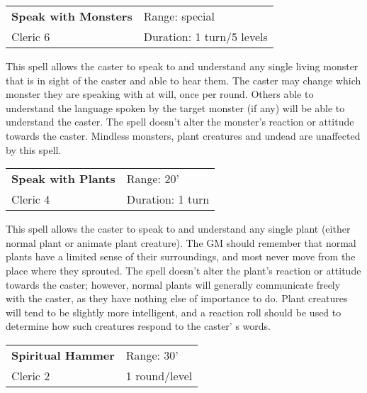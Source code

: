\documentclass[a4paper,twoside,openany,10pt]{book}
\begin{document}
\begin{multicols}{2}
\smallskip\begin{flushleft} 
	\begin{tabularx}{0.45\textwidth}{@{}m{3.5cm}m{5.5cm}@{}} 
		\textbf{Speak with Monsters} & Range: special\\
		Cleric 6 & Duration: 1 turn/5 levels\\
	\end{tabularx}\end{flushleft}

This spell allows the caster to speak to and understand any single living monster that is in sight of the caster and able to hear them. The caster may change which monster they are speaking with at will, once per round. Others able to understand the language spoken by the target monster (if any) will be able to understand the caster. The spell doesn't alter the monster's reaction or attitude towards the caster. Mindless monsters, plant creatures and undead are unaffected by this spell.


\smallskip\begin{flushleft} 
	\begin{tabularx}{0.45\textwidth}{@{}m{3.5cm}m{5.5cm}@{}} 
		\textbf{Speak with Plants} & Range: 20'\\
		Cleric 4 & Duration: 1 turn\\
	\end{tabularx}\end{flushleft}

This spell allows the caster to speak to and understand any single plant (either normal plant or animate plant creature). The GM should remember that normal plants have a limited sense of their surroundings, and most never move from the place where they sprouted. The spell doesn't alter the plant's reaction or attitude towards the caster; however, normal plants will generally communicate freely with the caster, as they have nothing else of importance to do. Plant creatures will tend to be slightly more intelligent, and a reaction roll should be used to determine how such creatures respond to the caster' s words.

\smallskip\begin{flushleft} 
	\begin{tabularx}{0.45\textwidth}{@{}m{3.5cm}m{5.5cm}@{}} 
		\textbf{Spiritual Hammer} & Range: 30'\\
		Cleric 2 &  1 round/level\\
	\end{tabularx}\end{flushleft}


\end{multicols}
\end{document}
